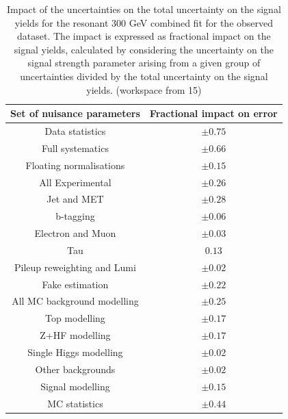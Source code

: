 \begin{table}
\centering
\begin{tabular}{|c|c|}
\hline
Set of nuisance parameters & Fractional impact on error\\
\hline
Data statistics & $\pm 0.75$\\
Full systematics & $\pm 0.66$\\
\hline
Floating normalisations & $\pm 0.15$ \\
\hline
All Experimental & $\pm 0.26$\\
Jet and MET & $\pm 0.28$ \\
b-tagging & $\pm 0.06$\\
Electron and Muon & $\pm 0.03$\\
Tau & $0.13$\\
Pileup reweighting and Lumi & $\pm 0.02$\\
\hline
Fake estimation & $\pm 0.22$\\
\hline
All MC background modelling & $\pm 0.25$\\
Top modelling & $\pm 0.17$\\ 
Z+HF modelling & $\pm 0.17$\\
Single Higgs modelling & $\pm 0.02$\\
Other backgrounds & $\pm 0.02$\\
\hline
Signal modelling & $\pm 0.15$\\
\hline
MC statistics & $\pm 0.44$\\
\hline
\end{tabular}
\caption{Impact of the uncertainties on the total uncertainty on the signal yields for the resonant 300 GeV combined fit for the observed dataset. The impact is expressed as fractional impact on the signal yields,  calculated by considering the uncertainty on the signal strength parameter arising from a given group of uncertainties divided by the total uncertainty on the signal yields.  (workspace from 15)}
\label{sec:fit:tab:CombBreakdown2HDM300Observed}
\end{table}

